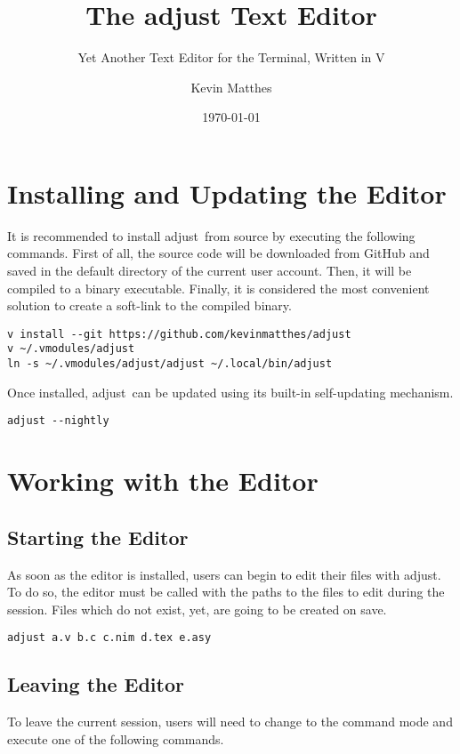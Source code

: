 \documentclass[11pt, a4paper, british]{scrartcl}
\author{Kevin Matthes}
\date{\today}
\subtitle{Yet Another Text Editor for the Terminal, Written in V}
\title{The adjust Text Editor}
\DeclareRobustCommand{\adjust}{\textsf{adjust}}
\begin{document}
\maketitle
\tableofcontents

\section{Installing and Updating the Editor}
\label{sec:installing-and-updating}
It is recommended to install \adjust\ from source by executing the following
commands.  First of all, the source code will be downloaded from GitHub and
saved in the default directory of the current user account.  Then, it will be
compiled to a binary executable.  Finally, it is considered the most convenient
solution to create a soft-link to the compiled binary.

\begin{lstlisting}[caption = Installing \adjust\ from source]
v install --git https://github.com/kevinmatthes/adjust
v ~/.vmodules/adjust
ln -s ~/.vmodules/adjust/adjust ~/.local/bin/adjust
\end{lstlisting}

Once installed, \adjust\ can be updated using its built-in self-updating
mechanism.

\begin{lstlisting}[caption = Updating \adjust]
adjust --nightly
\end{lstlisting}

\section{Working with the Editor}
\label{sec:working}
\subsection{Starting the Editor}
\label{sec:working:starting}
As soon as the editor is installed, users can begin to edit their files with
\adjust.  To do so, the editor must be called with the paths to the files to
edit during the session.  Files which do not exist, yet, are going to be created
on save.

\begin{lstlisting}[caption = Starting \adjust]
adjust a.v b.c c.nim d.tex e.asy
\end{lstlisting}

\subsection{Leaving the Editor}
\label{sec:working:leaving}
To leave the current session, users will need to change to the command mode and
execute one of the following commands.
\end{document}
